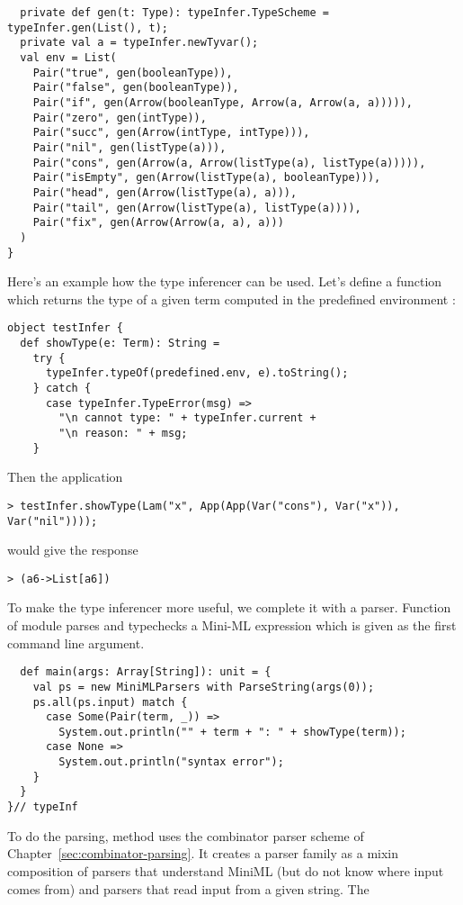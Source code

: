 \documentclass[a4paper,12pt,twoside,titlepage]{book}
\begin{document}
{\begin{lstlisting}
  private def gen(t: Type): typeInfer.TypeScheme = typeInfer.gen(List(), t);
  private val a = typeInfer.newTyvar();
  val env = List(
    Pair("true", gen(booleanType)),
    Pair("false", gen(booleanType)),
    Pair("if", gen(Arrow(booleanType, Arrow(a, Arrow(a, a))))),
    Pair("zero", gen(intType)),
    Pair("succ", gen(Arrow(intType, intType))),
    Pair("nil", gen(listType(a))),
    Pair("cons", gen(Arrow(a, Arrow(listType(a), listType(a))))),
    Pair("isEmpty", gen(Arrow(listType(a), booleanType))),
    Pair("head", gen(Arrow(listType(a), a))),
    Pair("tail", gen(Arrow(listType(a), listType(a)))),
    Pair("fix", gen(Arrow(Arrow(a, a), a)))
  )
}
\end{lstlisting}
Here's an example how the type inferencer can be used.
Let's define a function  which returns the type of
a given term computed in the predefined environment
:
\begin{lstlisting}
object testInfer {
  def showType(e: Term): String =
    try {
      typeInfer.typeOf(predefined.env, e).toString();
    } catch {
      case typeInfer.TypeError(msg) => 
        "\n cannot type: " + typeInfer.current +
        "\n reason: " + msg;
    }
\end{lstlisting}
Then the application
\begin{lstlisting}
> testInfer.showType(Lam("x", App(App(Var("cons"), Var("x")), Var("nil"))));
\end{lstlisting}
would give the response
\begin{lstlisting}
> (a6->List[a6])
\end{lstlisting}
To make the type inferencer more useful, we complete it with a
parser. 
Function  of module 
parses and typechecks a Mini-ML expression which is given as the first
command line argument.
\begin{lstlisting}
  def main(args: Array[String]): unit = {
    val ps = new MiniMLParsers with ParseString(args(0));
    ps.all(ps.input) match {
      case Some(Pair(term, _)) => 
        System.out.println("" + term + ": " + showType(term));
      case None =>
        System.out.println("syntax error");
    }
  }
}// typeInf
\end{lstlisting}
To do the parsing, method  uses the combinator parser
scheme of Chapter~\ref{sec:combinator-parsing}. It creates a parser
family  as a mixin composition of parsers
that understand MiniML (but do not know where input comes from) and
parsers that read input from a given string.  The 
}
\end{document}
